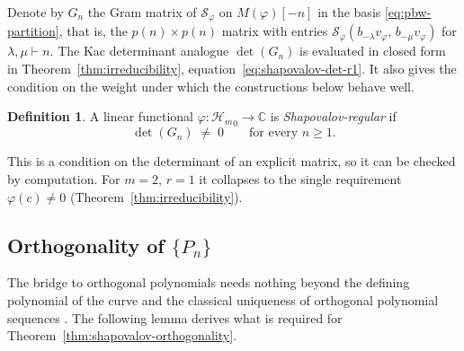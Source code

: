 \documentclass[12pt]{amsart}
\theoremstyle{plain}
\theoremstyle{definition}
\newtheorem{definition}[theorem]{Definition}
\newcommand{\CC}{\mathbb{C}}
\newcommand{\Hm}{{\mathcal{H}_m}}     %
\newcommand{\Mf}{M(\varphi)}          %
\newcommand{\Sf}{\mathcal{S}_\varphi} %
\newcommand{\Pn}{\{P_n\}}             %
\newcommand{\vf}{v_\varphi}           %
\begin{document}
Denote by $G_n$ the Gram matrix of $\Sf$ on $\Mf[-n]$ in the basis
\eqref{eq:pbw-partition}, that is, the $p(n) \times p(n)$ matrix with
entries $\Sf(b_{-\lambda}\vf,\, b_{-\mu}\vf)$ for $\lambda, \mu \vdash n$. The Kac determinant
analogue $\det(G_n)$ is evaluated in closed form in
Theorem~\ref{thm:irreducibility}, equation~\eqref{eq:shapovalov-det-r1}.
It also gives the condition on the weight under which the constructions
below behave well.

\begin{definition}
\label{def:p-admissible}
A linear functional $\varphi\colon \Hm_0 \to \CC$ is
\emph{Shapovalov-regular} if
\[
  \det(G_n) \;\neq\; 0 \qquad\text{for every } n \ge 1 .
\]
\end{definition}

This is a condition on the determinant of an explicit matrix, so it can
be checked by computation. For $m = 2$, $r = 1$ it collapses to the
single requirement $\varphi(c)\neq 0$
(Theorem~\ref{thm:irreducibility}).

\subsection{Orthogonality of $\Pn$}
\label{subsec:orthogonality}

The bridge to orthogonal polynomials needs nothing beyond the defining
polynomial of the curve and the classical uniqueness of orthogonal
polynomial sequences \cite{Szego1939}. The following lemma derives what
is required for Theorem~\ref{thm:shapovalov-orthogonality}.
\end{document}
